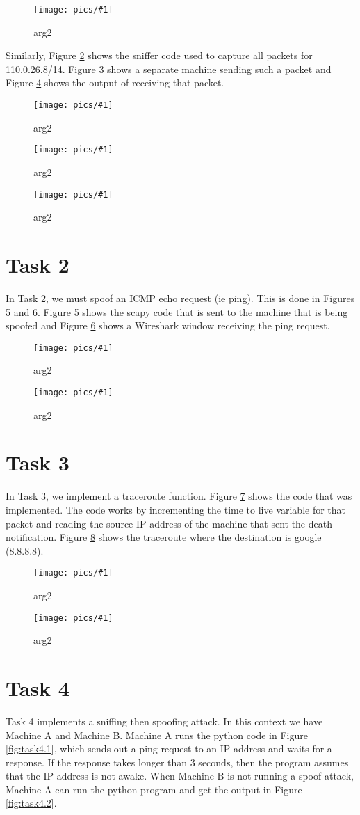 \documentclass[11pt]{article}
\newcommand{\fig}[2]{ 
\begin{figure}[h]
	\centering
	\caption{#2}
	\texttt{[image: pics/\#1]}
	\label{fig:#1}
\end{figure} 
}
\begin{document}
\fig{task1.7}{arg2}

\newpage

Similarly, Figure \ref{fig:task1.8} shows the sniffer code used to capture all packets for 110.0.26.8/14. Figure \ref{fig:task1.9} shows a separate machine sending such a packet and Figure \ref{fig:task1.10} shows the output of receiving that packet.

\fig{task1.8}{arg2}

\fig{task1.9}{arg2}

\fig{task1.10}{arg2}

\newpage 

\section*{Task 2}

In Task 2, we must spoof an ICMP echo request (ie ping). This is done in Figures \ref{fig:task2.1} and \ref{fig:task2.2}. Figure \ref{fig:task2.1} shows the scapy code that is sent to the machine that is being spoofed and Figure \ref{fig:task2.2} shows a Wireshark window receiving the ping request.

\fig{task2.1}{arg2}

\fig{task2.2}{arg2}

\newpage 

\section*{Task 3}

In Task 3, we implement a traceroute function. Figure \ref{fig:task3.0} shows the code that was implemented. The code works by incrementing the time to live variable for that packet and reading the source IP address of the machine that sent the death notification. Figure \ref{fig:task3.1} shows the traceroute where the destination is google (8.8.8.8).

\fig{task3.0}{arg2}

\fig{task3.1}{arg2}


\newpage 

\section*{Task 4}

Task 4 implements a sniffing then spoofing attack. In this context we have Machine A and Machine B. Machine A runs the python code in Figure \ref{fig:task4.1}, which sends out a ping request to an IP address and waits for a response. If the response takes longer than 3 seconds, then the program assumes that the IP address is not awake. When Machine B is not running a spoof attack, Machine A can run the python program and get the output in Figure \ref{fig:task4.2}.
\end{document}
